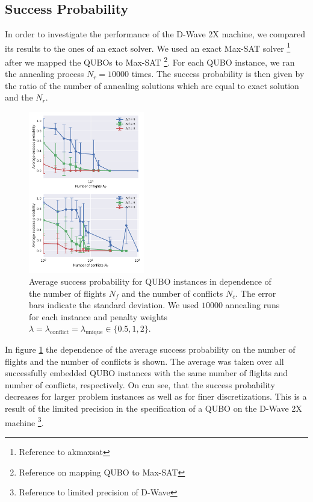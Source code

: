 \subsection{Success Probability}
In order to investigate the performance of the D-Wave 2X machine, we compared its results to the ones of an exact solver.
We used an exact Max-SAT solver \footnote{Reference to akmaxsat} after we mapped the QUBOs to Max-SAT \footnote{Reference on mapping QUBO to Max-SAT}.
For each QUBO instance, we ran the annealing process $N_r = 10000$ times. 
The success probability is then given by the ratio of the number of annealing solutions which are equal to exact solution and the $N_r$.

\begin{figure}[htpb]
    \centering
    \includegraphics[width=0.45\textwidth]{./pics/annealing_results_success_vs_flights_and_conflicts.pdf}
    \caption{Average success probability for QUBO instances in dependence of the number of flights $N_f$ and the number of conflicts $N_c$. 
             The error bars indicate the standard deviation.
             We used $10000$ annealing runs for each instance and penalty weights $\lambda = \lambda_\text{conflict} = \lambda_\text{unique} \in \{0.5, 1, 2\}$. 
    }
\label{fig:success_probability}
\end{figure}

In figure \ref{fig:success_probability} the dependence of the average success probability on the number of flights and the number of conflicts is shown.
The average was taken over all successfully embedded QUBO instances with the same number of flights and number of conflicts, respectively.
On can see, that the success probability decreases for larger problem instances as well as for finer discretizations. 
This is a result of the limited precision in the specification of a QUBO on the D-Wave 2X machine \footnote{Reference to limited precision of D-Wave}.

